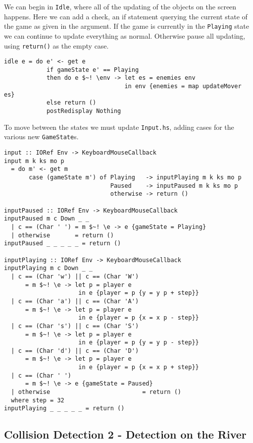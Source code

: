 \documentclass[12pt, a4paper]{report}
\begin{document}
We can begin in \verb|Idle|, where all of the updating of the objects on the screen happens.
Here we can add a check, an if statement querying the current state of the game as given in the argument.
If the game is currently in the \verb|Playing| state we can continue to update everything as normal.
Otherwise pause all updating, using \verb|return()| as the empty case.

\begin{lstlisting}
idle e = do e' <- get e
            if gameState e' == Playing
            then do e $~! \env -> let es = enemies env
                                  in env {enemies = map updateMover es}
            else return ()
            postRedisplay Nothing
\end{lstlisting}

To move between the states we must update \verb|Input.hs|, adding cases for the various new \verb|GameState|s.

\begin{lstlisting}
input :: IORef Env -> KeyboardMouseCallback
input m k ks mo p
  = do m' <- get m
       case (gameState m') of Playing   -> inputPlaying m k ks mo p
                              Paused    -> inputPaused m k ks mo p
                              otherwise -> return ()

inputPaused :: IORef Env -> KeyboardMouseCallback
inputPaused m c Down _ _
  | c == (Char ' ') = m $~! \e -> e {gameState = Playing}
  | otherwise       = return ()
inputPaused _ _ _ _ _ = return ()

inputPlaying :: IORef Env -> KeyboardMouseCallback
inputPlaying m c Down _ _
  | c == (Char 'w') || c == (Char 'W')
      = m $~! \e -> let p = player e
                     in e {player = p {y = y p + step}}
  | c == (Char 'a') || c == (Char 'A')
      = m $~! \e -> let p = player e
                     in e {player = p {x = x p - step}}
  | c == (Char 's') || c == (Char 'S')
      = m $~! \e -> let p = player e
                     in e {player = p {y = y p - step}}
  | c == (Char 'd') || c == (Char 'D')
      = m $~! \e -> let p = player e
                     in e {player = p {x = x p + step}}
  | c == (Char ' ')
      = m $~! \e -> e {gameState = Paused}
  | otherwise                          = return ()
  where step = 32
inputPlaying _ _ _ _ _ = return ()
\end{lstlisting}

\subsection{Collision Detection 2 - Detection on the River}
\end{document}
